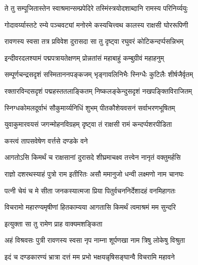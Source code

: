 \twolineshloka
{ते तु सम्पूजितास्तेन स्वाश्रमान्सम्प्रपेदिरे}
{तस्मिंस्त्रयोदशाब्दानि रामस्य परिनिर्य्ययुः}%

\twolineshloka
{गोदावर्य्यास्तटे रम्ये पञ्चवट्यां मनोरमे}
{कस्यचित्त्वथ कालस्य राक्षसी घोररूपिणी}%

\twolineshloka
{रावणस्य स्वसा तत्र प्रविवेश दुरासदा}
{सा तु दृष्ट्वा रघुवरं कोटिकन्दर्प्पसन्निभम्}%

\twolineshloka
{इन्दीवरदलश्यामं पद्मपत्रायतेक्षणम्}
{प्रोन्नतांसं महाबाहुं कम्बुग्रीवं महाहनुम्}%

\twolineshloka
{सम्पूर्णचन्द्रसदृशं सस्मिताननपङ्कजम्}
{भृङ्गावलिनिभैः स्निग्धैः कुटिलैः शीर्षजैर्वृतम्}%

\twolineshloka
{रक्तारविन्दसदृशं पद्महस्ततलाङ्कितम्}
{निष्कलङ्केन्दुसदृशं नखपङ्क्तिविराजितम्}%

\twolineshloka
{स्निग्धकोमलदूर्वाभं सौकुमार्य्यनिधिं शुभम्}
{पीतकौशेयवसनं सर्वाभरणभूषितम्}%

\twolineshloka
{युवाकुमारवयसं जगन्मोहनविग्रहम्}
{दृष्ट्वा तं राक्षसी रामं कन्दर्प्पशरपीडिता}%


\onelineshloka
{कस्त्वं तापसवेषेण वर्त्तसे दण्डके वने}%

\twolineshloka
{आगतोऽसि किमर्थं च राक्षसानां दुरासदे}
{शीघ्रमाचक्ष्व तत्त्वेन नानृतं वक्तुमर्हसि}%




\twolineshloka
{राज्ञो दशरथस्याहं पुत्रो राम इतीरितः}
{असौ ममानुजो धन्वी लक्ष्मणो नाम चानघः}%

\twolineshloka
{पत्नी चेयं च मे सीता जनकस्यात्मजा प्रिया}
{पितुर्वचननिर्देशादहं वनमिहागतः}%

\twolineshloka
{विचरामो महारण्यमृषीणां हितकाम्यया}
{आगतासि किमर्थं त्वमाश्रमं मम सुन्दरि}%


\onelineshloka
{इत्युक्ता सा तु रामेण प्राह वाक्यमशङ्किता}%


\twolineshloka
{अहं विश्रवसः पुत्री रावणस्य स्वसा नृप}
{नाम्ना शूर्पणखा नाम त्रिषु लोकेषु विश्रुता}%

\twolineshloka
{इदं च दण्डकारण्यं भ्रात्रा दत्तं मम प्रभो}
{भक्षयन्नृषिसङ्घान्वै विचरामि महावने}%

